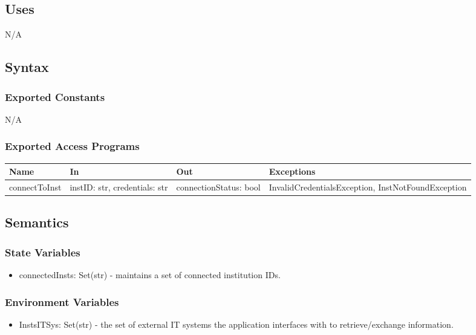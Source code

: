 \documentclass[12pt, titlepage]{article}
\begin{document}
\subsection{Uses}
N/A

\subsection{Syntax}

\subsubsection{Exported Constants}
N/A

\subsubsection{Exported Access Programs}

\begin{center}
  \begin{tabular}{p{3cm} p{4cm} p{4cm} p{5cm}}
    \hline
    \textbf{Name} & \textbf{In} & \textbf{Out} & \textbf{Exceptions} \\
    \hline
    connectToInst & instID: str, credentials: str & connectionStatus: bool &
      InvalidCredentialsException, InstNotFoundException \\
    \hline
  \end{tabular}
\end{center}

\subsection{Semantics}

\subsubsection{State Variables}
\begin{itemize}
    \item connectedInsts: Set(str) - maintains a set of connected institution IDs.
\end{itemize}

\subsubsection{Environment Variables}
\begin{itemize}
  \item InstsITSys: Set(str) - the set of external IT systems the application
    interfaces with to retrieve/exchange information.
\end{itemize}
\end{document}
